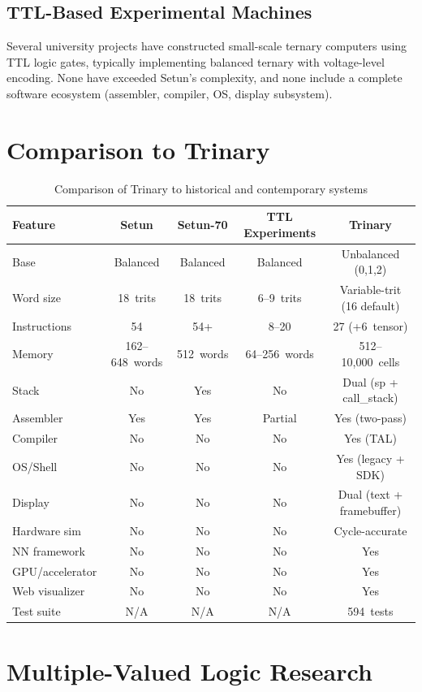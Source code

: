 \documentclass[12pt,a4paper,twoside]{book}
\theoremstyle{trinarytheorem}
\theoremstyle{trinarydefinition}
\begin{document}
\subsection{TTL-Based Experimental Machines}

Several university projects have constructed small-scale ternary computers
using TTL logic gates, typically implementing balanced ternary with
voltage-level encoding. None have exceeded Setun's complexity, and none
include a complete software ecosystem (assembler, compiler, OS, display
subsystem).

\section{Comparison to Trinary}

\begin{table}[H]
\centering
\caption{Comparison of Trinary to historical and contemporary systems}
\label{tab:comparison}
\begin{tabular}{lcccc}
\toprule
Feature & Setun & Setun-70 & TTL Experiments & Trinary \\
\midrule
Base & Balanced & Balanced & Balanced & Unbalanced (0,1,2) \\
Word size & 18~trits & 18~trits & 6--9~trits & Variable-trit (16 default) \\
Instructions & 54 & 54+ & 8--20 & 27 (+6~tensor) \\
Memory & 162--648~words & 512~words & 64--256~words & 512--10{,}000~cells \\
Stack & No & Yes & No & Dual (sp + call\_stack) \\
Assembler & Yes & Yes & Partial & Yes (two-pass) \\
Compiler & No & No & No & Yes (TAL) \\
OS/Shell & No & No & No & Yes (legacy + SDK) \\
Display & No & No & No & Dual (text + framebuffer) \\
Hardware sim & No & No & No & Cycle-accurate \\
NN framework & No & No & No & Yes \\
GPU/accelerator & No & No & No & Yes \\
Web visualizer & No & No & No & Yes \\
Test suite & N/A & N/A & N/A & 594~tests \\
\bottomrule
\end{tabular}
\end{table}

\section{Multiple-Valued Logic Research}
\end{document}
